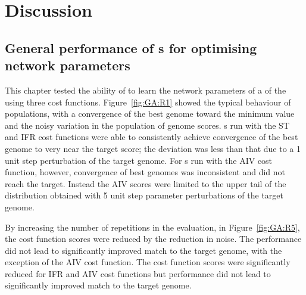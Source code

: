 



\section{Discussion}\label{sec:GA:discussion}

\subsection[General performance of {GA}s]{General performance of {\GA}s for optimising network
  parameters}\label{sec:GA:general-perf-disc}

This chapter tested the ability of  to learn the network
parameters of a  of the {\CN} using three cost
functions. Figure~\ref{fig:GA:R1} showed the typical behaviour of {\GA}
populations, with a convergence of the best genome toward the minimum value
and the noisy variation in the population of genome scores. {\GA}s run with
the ST and IFR cost functions were able to consistently achieve convergence
of the best genome to very near the target score; the deviation was less
than that due to a 1 unit step perturbation of the target genome. For
{\GA}s run with the AIV cost function, however, convergence of best genomes
was inconsistent and did not reach the target. Instead the AIV scores were
limited to the upper tail of the distribution obtained with 5 unit step
parameter perturbations of the target genome.

\smallskip{}

By increasing the number of repetitions in the {\GA} evaluation, in
Figure~\ref{fig:GA:R5}, the cost function scores were reduced by the
reduction in noise. The {\GA} performance did not lead to significantly
improved match to the target genome, with the exception of the AIV cost
function.  The cost function scores were significantly reduced for IFR and
AIV cost functions but {\GA} performance did not lead to significantly
improved match to the target genome.


